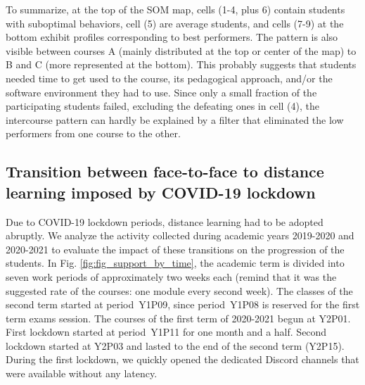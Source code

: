 \documentclass{aims}
\theoremstyle{definition}
\begin{document}
To summarize, at the top of the SOM map, cells (1-4, plus 6) contain
students with suboptimal behaviors, cell (5) are average students, and
cells (7-9) at the bottom exhibit profiles corresponding to best
performers. The pattern is also visible between courses A (mainly
distributed at the top or center of the map) to B and C (more
represented at the bottom). This probably suggests that students needed
time to get used to the course, its pedagogical approach, and/or the
software environment they had to use. Since only a small fraction of the
participating students failed, excluding the defeating ones in cell (4),
the intercourse pattern can hardly be explained by a filter that
eliminated the low performers from one course to the other.

\hypertarget{transition-between-face-to-face-to-distance-learning-imposed-by-covid-19-lockdown-1}{%
\subsection{Transition between face-to-face to distance learning imposed
by COVID-19
lockdown}\label{transition-between-face-to-face-to-distance-learning-imposed-by-covid-19-lockdown-1}}

Due to COVID-19 lockdown periods, distance learning had to be adopted
abruptly. We analyze the activity collected during academic years
2019-2020 and 2020-2021 to evaluate the impact of these transitions on
the progression of the students. In Fig. \ref{fig:fig_support_by_time},
the academic term is divided into seven work periods of approximately
two weeks each (remind that it was the suggested rate of the courses:
one module every second week). The classes of the second term started at
period~Y1P09, since period~Y1P08 is reserved for the first term exams
session. The courses of the first term of 2020-2021 begun at Y2P01.
First lockdown started at period~Y1P11 for one month and a half. Second
lockdown started at Y2P03 and lasted to the end of the second term
(Y2P15). During the first lockdown, we quickly opened the dedicated
Discord channels that were available without any latency.
\end{document}
